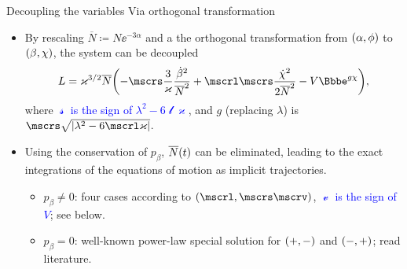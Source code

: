 \documentclass[8pt]{beamer}
\begin{document}
\begin{frame}%
{Decoupling the variables}%
{Via orthogonal transformation}
\begin{itemize}
\item By rescaling $\overline{N} \coloneqq N\ee^{-3\alpha}$ and a
the orthogonal transformation from ${\left(\alpha, \phi\right)}$ to ${\left(\beta, \chi\right)}$,
the system can be decoupled
\begin{align}
L = \varkappa^{3/2}\overline{N}
\rbr{-\mscrs\frac{3}{\varkappa}\frac{\dot{\beta}^2}{\overline{N}^2}
+\mscrl\mscrs\frac{\dot{\chi}^2}{2\overline{N}^2}
-V\ee^{g \chi}},
\label{eq:lagrangian-decoupled}
\end{align}
where \textcolor{blue}{$\mscrs$ is the sign of $\lambda^2 - 6\mscrl\varkappa$},
and $g$ (replacing $\lambda$) is $\mscrs\sqrt{\vbr{\lambda^2 -
6\mscrl\varkappa}}$.

\item Using the \alert{conservation of $p_\beta$}, ${\overline{N}}\mathopen{}\left(t\right)\mathclose{}$ can be eliminated, 
leading to the exact integrations of the equations of motion as \alert{implicit 
trajectories}.
\begin{itemize}
\item $p_\beta \neq 0$: four cases according to $\rbr{\mscrl, \mscrs \mscrv}$,
\textcolor{blue}{$\mscrv$ is the sign of $V$}; see below.
\item $p_\beta = 0$: well-known power-law special solution for ${\left(+,-\right)}$ 
and ${\left(-,+\right)}$; read
literature.
\end{itemize}

\end{itemize}
\end{frame}
\end{document}
